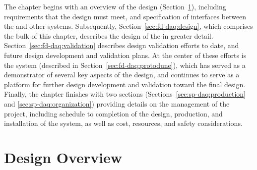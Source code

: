 The chapter begins with an overview of the  design
(Section~\ref{sec:fd-daq:overview}), including requirements that the design
must meet, and specification of interfaces between the   and other
  systems.  Subsequently,
Section~\ref{sec:fd-daq:design}, which comprises the bulk of this chapter,
describes the design of the   in greater detail.
Section~\ref{sec:fd-daq:validation} describes design validation efforts to
date, and future design development and validation plans. At the center of
these efforts is the    system (described in
Section~\ref{sec:fd-daq:protodune}), which has served as a demonstrator of
several key aspects of the      design, and continues
to serve as a platform for further design development and validation toward
the final design.  Finally, the chapter finishes with two sections
(Sections~\ref{sec:sp-daq:production} and \ref{sec:sp-daq:organization})
providing details on the management of the  project, including
schedule to completion of the design,  production, and installation of the
system, as well as cost, resources, and safety considerations.

\section{Design Overview}
\label{sec:fd-daq:overview}

